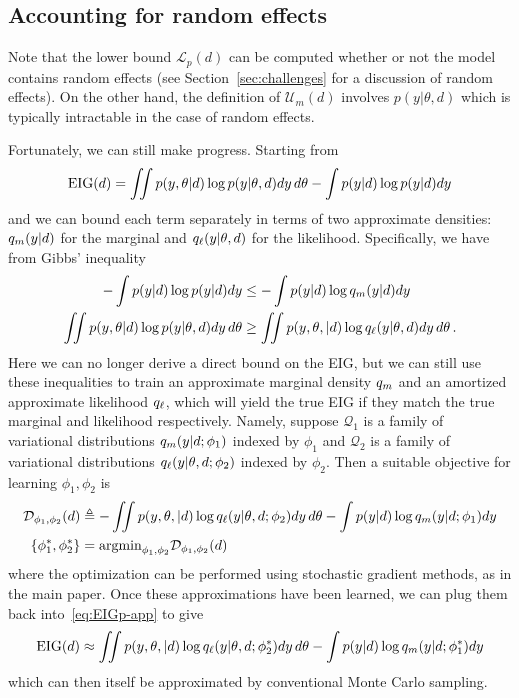 \subsection{Accounting for random effects}
Note that the lower bound $\mathcal{L}_p(d)$ can be computed whether or not the model contains random effects (see Section~\ref{sec:challenges} for a discussion of random effects). On the other hand, the definition of $\mathcal{U}_m(d)$ involves $p(y|\theta,d)$ which is typically intractable in the case of random effects.

Fortunately, we can still make progress. Starting from
\begin{equation}
\label{eq:EIGp-app}
	\text{EIG}(d) = \iint  p(y, \theta | d) \log p(y|\theta, d) dy\,d\theta - \int p(y | d) \log p(y | d) dy
\end{equation}
and we can bound each term separately in terms of two approximate densities: $q_m(y|d)$ for the marginal and $q_\ell(y|\theta,d)$ for the likelihood. Specifically,
we have from Gibbs' inequality
\begin{align}
	-\int p(y | d) \log p(y | d) dy &\le -\int  p(y|d)\log q_m(y|d) dy \\
	\iint p(y, \theta |d) \log p(y|\theta,d) dy\,d\theta & \ge \iint p(y, \theta, | d) \log q_\ell(y|\theta, d) dy\,d\theta \,.
\end{align}
Here we can no longer derive a direct bound on the EIG, but we can still
use these inequalities to train an approximate marginal density $q_m$ and an amortized approximate likelihood $q_\ell$, which will yield the
true EIG if they match the true marginal and likelihood respectively.
Namely, suppose $\mathcal{Q}_1$ is a family of variational distributions  $q_m(y|d; \phi_1)$ indexed by $\phi_1$ 
and $\mathcal{Q}_2$ is a family of variational distributions $q_\ell(y|\theta,d; \phi_2)$ indexed by $\phi_2$. Then a suitable objective for learning $\phi_1, \phi_2$ is
\begin{align}
\mathcal{D}_{\phi_1, \phi_2}(d) &\triangleq
- \iint  p(y, \theta, | d) \log q_\ell(y|\theta, d; \phi_2)dy\,d\theta 
-\int p(y | d) \log q_m(y | d; \phi_1)dy  \\
\{\phi_1^*, \phi_2^*\}	&= \text{argmin}_{\phi_1, \phi_2} \mathcal{D}_{\phi_1, \phi_2}(d)
	\end{align}
where the optimization can be performed using stochastic gradient methods, as in the main paper. Once these approximations have been learned, we can plug
them back into~\eqref{eq:EIGp-app} to give
\begin{equation}
	 \text{EIG}(d) \approx  \iint  p(y, \theta, | d)\log q_\ell(y|\theta, d; \phi_2^*) dy\,d\theta 
	 -\int p(y | d) \log q_m(y | d; \phi_1^*) dy
\end{equation}
which can then itself be approximated by conventional Monte Carlo
sampling.


